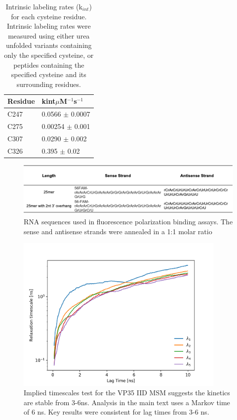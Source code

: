 \documentclass[../main.tex]{subfiles}
\begin{document}
    \begin{table}[]
    \centering
    \caption[Intrinsic labeling rates (k$_{int}$) for each cysteine residue.]{Intrinsic labeling rates (k$_{int}$) for each cysteine residue. Intrinsic labeling rates were measured using either urea unfolded variants containing only the specified cysteine, or peptides containing the specified cysteine and its surrounding residues.}
    \label{tab:ch5-supptab2}
    \begin{tabular}{ll}
    \hline
    Residue & kint$\mu$M$^{-1}$s$^{-1}$      \\ \hline
    C247    & 0.0566 $\pm$ 0.0007 \\ \hline
    C275    & 0.00254 $\pm$ 0.001 \\ \hline
    C307    & 0.0290 $\pm$ 0.002  \\ \hline
    C326    & 0.395 $\pm$ 0.02    \\ \hline
    \end{tabular}
    \end{table}

    \begin{figure}[!htb] %
        \centering
        \includegraphics[width=5in]{ch5-suppfig7.png}
        \caption[RNA sequences used in fluorescence polarization binding assays.]
            {RNA sequences used in fluorescence polarization binding assays. The sense and antisense strands were annealed in a 1:1 molar ratio}
        \label{fig:ch5-suppfig7}
    \end{figure}

    \begin{figure}[!htb] %
        \centering
        \includegraphics[width=4in]{ch5-suppfig8.png}
        \caption[Implied timescales test for the VP35 IID MSM.]
            {Implied timescales test for the VP35 IID MSM suggests the kinetics are stable from 3-6ns. Analysis in the main text uses a Markov time of 6 ns. Key results were consistent for lag times from 3-6 ns.}
        \label{fig:ch5-suppfig8}
    \end{figure}


	
	
\end{document}
